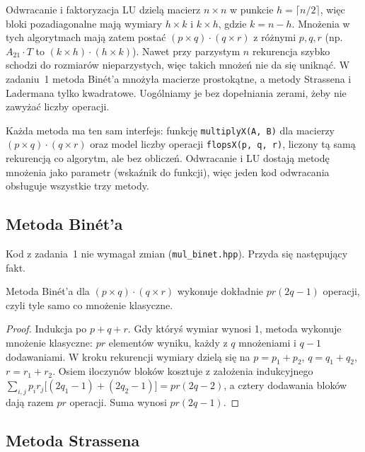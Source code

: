 Odwracanie i faktoryzacja LU dzielą macierz $n\times n$ w punkcie $h=\lceil n/2\rceil$, więc bloki pozadiagonalne
mają wymiary $h\times k$ i $k\times h$, gdzie $k=n-h$. Mnożenia w tych algorytmach mają zatem postać
$(p\times q)\cdot(q\times r)$ z różnymi $p,q,r$ (np.\ $A_{21}\cdot T$ to $(k\times h)\cdot(h\times k)$). Nawet przy
parzystym $n$ rekurencja szybko schodzi do rozmiarów nieparzystych, więc takich mnożeń nie da się uniknąć.
W zadaniu~1 metoda Binét'a mnożyła macierze prostokątne, a metody Strassena i Ladermana tylko kwadratowe.
Uogólniamy je bez dopełniania zerami, żeby nie zawyżać liczby operacji.

Każda metoda ma ten sam interfejs: funkcję \texttt{multiplyX(A, B)} dla macierzy
$(p\times q)\cdot(q\times r)$ oraz model liczby operacji \texttt{flopsX(p, q, r)}, liczony tą samą rekurencją co
algorytm, ale bez obliczeń. Odwracanie i LU dostają metodę mnożenia jako parametr (wskaźnik do funkcji), więc
jeden kod odwracania obsługuje wszystkie trzy metody.

\subsection{Metoda Binét'a}
Kod z zadania~1 nie wymagał zmian (\texttt{mul\_binet.hpp}). Przyda się następujący fakt.

\begin{lem}\label{lem:binet}
Metoda Binét'a dla $(p\times q)\cdot(q\times r)$ wykonuje dokładnie $pr(2q-1)$ operacji, czyli tyle samo co mnożenie
klasyczne.
\end{lem}
\begin{proof}
Indukcja po $p+q+r$. Gdy któryś wymiar wynosi 1, metoda wykonuje mnożenie klasyczne: $pr$ elementów wyniku,
każdy z $q$ mnożeniami i $q-1$ dodawaniami. W kroku rekurencji wymiary dzielą się na $p=p_1+p_2$, $q=q_1+q_2$,
$r=r_1+r_2$. Osiem iloczynów bloków kosztuje z założenia indukcyjnego
$\sum_{i,j}p_ir_j\bigl[(2q_1-1)+(2q_2-1)\bigr]=pr(2q-2)$, a cztery dodawania bloków dają razem $pr$ operacji.
Suma wynosi $pr(2q-1)$.
\end{proof}

\subsection{Metoda Strassena}

